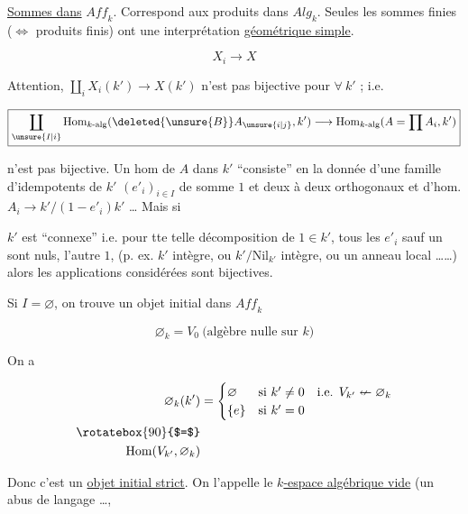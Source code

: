  \uline{Sommes dans} $\mathit{Aff}_k$. Correspond aux produits dans $\mathit{Alg}_k$. Seules les sommes finies ($\Longleftrightarrow$ produits finis) ont une interprétation \uline{géométrique simple}.

\[
X_i\longrightarrow X
\]

Attention, $\boxed{\coprod_i X_i(k')\to X(k')}$ n'est pas bijective pour $\forall\ k'$ ;  i.e.

\[
\boxed{\coprod_{\unsure{I|i}}\mathrm{Hom}_{k\text{-}\mathrm{alg}}(\deleted{\unsure{B}}A_{\unsure{i|j}},k')\longrightarrow
\mathrm{Hom}_{k\text{-}\mathrm{alg}}(A=\prod A_i,k')}
\]

n'est pas bijective.  Un hom de $A$ dans $k'$ ``consiste'' en la donnée d'une famille d'idempotents de $k'$ $(e'_i)_{i\in I}$ de somme $1$ et deux à deux orthogonaux et d'hom. $A_i\to k'/(1-e'_i)k'$ \ldots{} Mais si


$k'$ est ``connexe'' i.e. pour tte telle décomposition de $1\in k'$,  tous les $e'_i$ sauf un sont nuls, l'autre $1$,  (p. ex. $k'$  intègre, ou $k'/\mathrm{Nil}_{k'}$ intègre,  ou  un anneau local \ldots\ldots) alors les applications considérées sont bijectives.


Si $I=\varnothing$, on trouve un objet initial dans $\mathit{Aff}_k$

\[
\varnothing_k=V_0\ \text{(algèbre nulle sur $k$)}
\]

On a 

\[
\begin{aligned}
\varnothing_k(k')&=\begin{cases}
\varnothing&\text{si }k'\ne0 \quad\text{i.e. }V_{k'}\nleftarrow\varnothing_k\\
\{e\}&\text{si }k'=0
\end{cases}\\
\rotatebox{90}{$=$}&\\
\mathrm{Hom}(V_{k'},\varnothing_k)&
\end{aligned}
\]

Donc c'est un \uline{objet initial strict}. On l'appelle le \uline{$k$-espace algébrique vide} (un  abus de langage \ldots,

